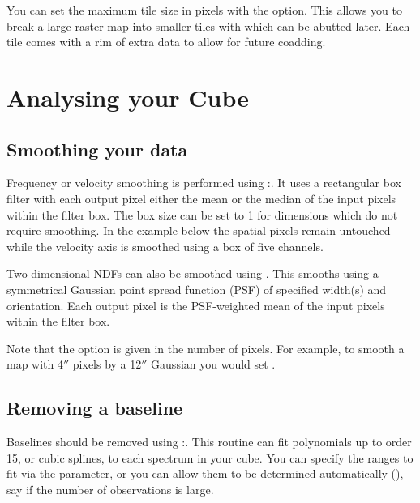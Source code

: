 \documentclass[11pt,oneside,chapters]{starlink}
\providecommand{\arcm}{\si{\arcminute}}%
\providecommand{\arcsec}{\si{\arcsecond}}%
\begin{document}
You can set the maximum tile size in pixels with the 
option. This allows you to break a large raster map into smaller tiles
with which can be abutted later.  Each tile comes with a rim of extra
data to allow for future coadding.


\clearpage
\chapter{Analysing your Cube}
\label{sec:analyse}

\section{Smoothing your data}

Frequency or velocity smoothing is performed using \Kappa:\block. It
uses a rectangular box filter with each output pixel either the mean
or the median of the input pixels within the filter box. The box size
can be set to 1 for dimensions which do not require smoothing. In the
example below the spatial pixels remain untouched while the velocity
axis is smoothed using a box of five channels.
\begin{terminalv}
\end{terminalv}

Two-dimensional NDFs can also be smoothed using \gausmooth. This
smooths using a symmetrical Gaussian point spread function (PSF) of
specified width(s) and orientation. Each output pixel is the
PSF-weighted mean of the input pixels within the filter box.

\begin{terminalv}
\end{terminalv}
Note that the  option is given in the number of pixels.
For example, to smooth a map with 4$\arcsec$ pixels by a 12$\arcsec$ Gaussian
you would set .

\section{Removing a baseline}

Baselines should be removed using \Kappa:\mfittrend. This routine can
fit polynomials up to order 15, or cubic splines, to each spectrum in
your cube. You can specify the ranges to fit via the 
parameter, or you can allow them to be determined automatically
(), say if the number of observations is large.
\end{document}
